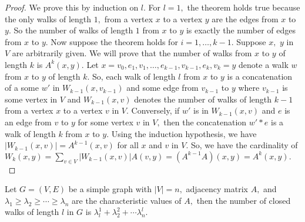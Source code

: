 
\begin{proof}
	We prove this by induction on $l.$ For $l=1,$ the theorem holds 
	true because the only walks of length $1,$ from a vertex $x$ to 
	a vertex $y$ are the edges from $x$ to $y.$  So the number of
	walks of length $1$ from $x$ to $y$ is exactly the number of
	edges from $x$ to $y.$ Now suppose the theorem holds for $i=
	1, \dotsc, k-1.$ Suppose $x,$ $y$ in $V$ are arbitrarily given.
	We will prove that the number of walks from $x$ to $y$ of length
	$k$ is $A^k(x,y).$ Let $x = v_0, e_1, v_1, \dotsc, e_{k-1},
	v_{k-1}, e_k, v_k = y$ denote a walk $w$ from $x$ to $y$ of 
	length $k.$ So, each walk of length $l$ from $x$ to $y$ is
	a concatenation of a some $w'$ in $W_{k-1}(x,v_{k-1})$ and 
	some edge from $v_{k-1}$ to $y$ where $v_{k-1}$ is some vertex 
	in $V$ and $W_{k-1}(x, v)$ denotes the number of walks of length
	$k-1$ from a vertex $x$ to a vertex $v$ in $V.$
	Conversely, if $w'$ is in $W_{k-1}(x,v)$ and $e$ is an edge from
	$v$ to $y$ for some vertex $v$ in $V,$ then the concatenation
	$w' \ast e$ is a walk of length $k$ from $x$ to $y.$
	Using the induction hypothesis, we have $ \lvert W_{k-1}(x,v) \rvert = A^{k-1} (x,v)$ for all $x$ and $v$ in $V.$
	So, we have the cardinality of $W_{k}(x,y) = 
	\sum_{v\in V} \lvert W_{k-1}(x,v) \rvert A(v,y) = 
	(A^{k-1} A)(x,y) = A^k (x,y).$
\end{proof}

\begin{corollary}[]
	Let $G = (V,E)$ be a simple graph with $\lvert V \rvert = n,$
	adjacency matrix $A,$ and $\lambda_1 \geq \lambda _2 \geq \cdots
	\geq \lambda_n$ are the characteristic values of $A,$ then the
	number of closed walks of length $l$ in $G$ is
	$\lambda_l^1 + \lambda_2^2 + \cdots \lambda_n^l.$
\end{corollary}


\begin{figure}[h]
\centering
\end{figure}


